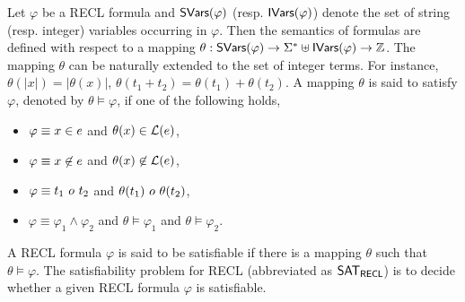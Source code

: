 Let $\varphi$ be a RECL formula and ${\sf SVars}(\varphi)$ (resp. ${\sf IVars}(\varphi)$) denote the set of string (resp. integer) variables occurring in $\varphi$. 
%
Then the semantics of formulas are defined with respect to a mapping $\theta: {\sf SVars}(\varphi) \rightarrow \Sigma^* \uplus {\sf IVars}(\varphi) \rightarrow \mathbb{Z}$. 
The mapping $\theta$ can be naturally extended to the set of integer terms. For instance, $\theta(|x|) =|\theta(x)|$, $\theta(t_1 + t_2) = \theta(t_1) + \theta(t_2)$. 
A  mapping $\theta$ is said to satisfy $\varphi$, denoted by $\theta \models \varphi$, if one of the following holds,  
\begin{itemize}
\item $\varphi \equiv x \in e$ and $\theta(x) \in \mathcal{L}(e)$, 
%
\item $\varphi \equiv x \not \in e$ and $\theta(x) \not \in \mathcal{L}(e)$, 
%
\item $\varphi \equiv t_1\ o\ t_2$ and $\theta(t_1)\ \op\ \theta(t_2)$, 
%
\item $\varphi \equiv \varphi_1 \wedge \varphi_2$ and $\theta \models \varphi_1$ and $\theta \models \varphi_2$.
\end{itemize}
A RECL formula $\varphi$ is said to be satisfiable if there is a mapping $\theta$ such that $\theta \models \varphi$. The satisfiability problem for RECL (abbreviated as ${\sf SAT_{RECL}}$) is to decide whether a given RECL formula $\varphi$ is satisfiable. 


